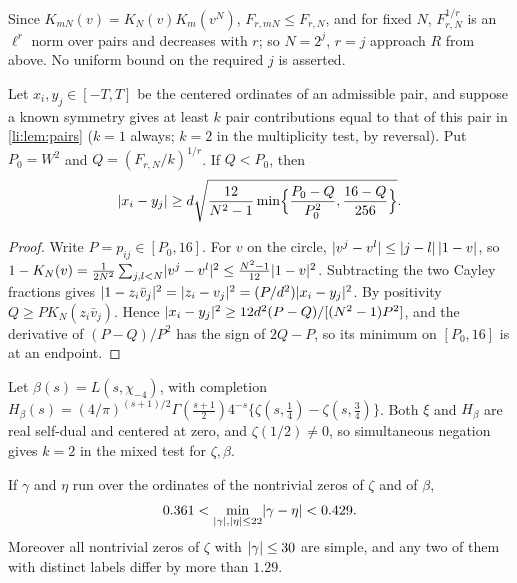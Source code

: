 Since $K_{mN}(v)=K_N(v)K_m(v^N)$, $F_{r,mN}\le F_{r,N}$, and for fixed $N$, $F_{r,N}^{1/r}$ is an
$\ell^r$ norm over pairs and decreases with $r$; so $N=2^j$, $r=j$ approach $R$ from above. No
uniform bound on the required $j$ is asserted.

\begin{theorem}\label{li:thm:gap}
Let $x_i,y_j\in[-T,T]$ be the centered ordinates of an admissible pair, and suppose a known
symmetry gives at least $k$ pair contributions equal to that of this pair in
\cref{li:lem:pairs} ($k=1$ always; $k=2$ in the multiplicity test, by reversal). Put $P_0=W^2$ and
$Q=(F_{r,N}/k)^{1/r}$. If $Q<P_0$, then
\begin{equation}\label{li:eq:gap}
 \lvert x_i-y_j\rvert\ge d\sqrt{\frac{12}{N^2-1}\min\Bigl\{\frac{P_0-Q}{P_0^2},\frac{16-Q}{256}\Bigr\}} .
\end{equation}
\end{theorem}

\begin{proof}
Write $P=p_{ij}\in[P_0,16]$. For $v$ on the circle, $\lvert v^j-v^l\rvert\le\lvert j-l\rvert\,\lvert1-v\rvert$, so
$1-K_N(v)=\frac1{2N^2}\sum_{j,l<N}\lvert v^j-v^l\rvert^2\le\frac{N^2-1}{12}\lvert1-v\rvert^2$. Subtracting the two
Cayley fractions gives $\lvert1-z_i\bar v_j\rvert^2=\lvert z_i-v_j\rvert^2=(P/d^2)\lvert x_i-y_j\rvert^2$. By positivity
$Q\ge PK_N(z_i\bar v_j)$. Hence $\lvert x_i-y_j\rvert^2\ge12d^2(P-Q)/[(N^2-1)P^2]$, and the derivative of
$(P-Q)/P^2$ has the sign of $2Q-P$, so its minimum on $[P_0,16]$ is at an endpoint.
\end{proof}

Let $\beta(s)=L(s,\chi_{-4})$, with completion
$H_\beta(s)=(4/\pi)^{(s+1)/2}\Gamma(\frac{s+1}2)4^{-s}\{\zeta(s,\frac14)-\zeta(s,\frac34)\}$. Both
$\xi$ and $H_\beta$ are real self-dual and centered at zero, and $\zeta(1/2)\ne0$, so simultaneous
negation gives $k=2$ in the mixed test for $\zeta,\beta$.

\begin{theorem}\label{li:thm:zetabeta}
If $\gamma$ and $\eta$ run over the ordinates of the nontrivial zeros of $\zeta$ and of $\beta$,
\[
 0.361<\min_{\lvert\gamma\rvert,\lvert\eta\rvert\le22}\lvert\gamma-\eta\rvert<0.429 .
\]
Moreover all nontrivial zeros of $\zeta$ with $\lvert\gamma\rvert\le30$ are simple, and any two of them with
distinct labels differ by more than $1.29$.
\end{theorem}

